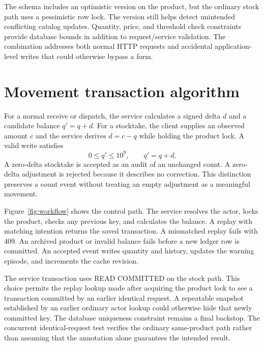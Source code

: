 The schema includes an optimistic version on the product, but the ordinary stock path uses a pessimistic row lock. The version still helps detect unintended conflicting catalog updates. Quantity, price, and threshold check constraints provide database bounds in addition to request/service validation. The combination addresses both normal HTTP requests and accidental application-level writes that could otherwise bypass a form.

\section{Movement transaction algorithm}
For a normal receive or dispatch, the service calculates a signed delta $d$ and a candidate balance $q'=q+d$. For a stocktake, the client supplies an observed amount $c$ and the service derives $d=c-q$ while holding the product lock. A valid write satisfies
\begin{equation}\label{eq:bounds}
 0\leq q'\leq 10^9, \qquad q'=q+d.
\end{equation}
A zero-delta stocktake is accepted as an audit of an unchanged count. A zero-delta adjustment is rejected because it describes no correction. This distinction preserves a count event without treating an empty adjustment as a meaningful movement.

Figure~\ref{fig:workflow} shows the control path. The service resolves the actor, locks the product, checks any previous key, and calculates the balance. A replay with matching intention returns the saved transaction. A mismatched replay fails with 409. An archived product or invalid balance fails before a new ledger row is committed. An accepted event writes quantity and history, updates the warning episode, and increments the cache revision.


The service transaction uses READ COMMITTED on the stock path. This choice permits the replay lookup made after acquiring the product lock to see a transaction committed by an earlier identical request. A repeatable snapshot established by an earlier ordinary actor lookup could otherwise hide that newly committed key. The database uniqueness constraint remains a final backstop. The concurrent identical-request test verifies the ordinary same-product path rather than assuming that the annotation alone guarantees the intended result.


